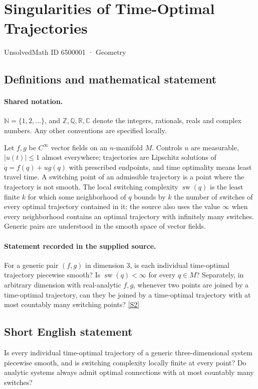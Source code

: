 \documentclass[11pt]{article}
\newcommand{\sref}[2]{\hyperlink{source:#1:#2}{[S#2]}}
\begin{document}
\setcounter{section}{6500000}
\section{Singularities of Time-Optimal Trajectories}\label{6500001}
{\small\sffamily UnsolvedMath ID 6500001 · Geometry}
\subsection{Definitions and mathematical statement}

\paragraph{Shared notation.}$\mathbb N=\{1,2,\ldots\}$, and $\mathbb Z,\mathbb Q,\mathbb R,\mathbb C$ denote the integers, rationals, reals and complex numbers. Any other conventions are specified locally.


Let $f,g$ be $C^\infty$ vector fields on an $n$-manifold $M$. Controls $u$ are measurable, $|u(t)|\leq1$ almost everywhere; trajectories are Lipschitz solutions of $\dot q=f(q)+ug(q)$ with prescribed endpoints, and time optimality means least travel time. A switching point of an admissible trajectory is a point where the trajectory is not smooth. The local switching complexity $\operatorname{sw}(q)$ is the least finite $k$ for which some neighborhood of $q$ bounds by $k$ the number of switches of every optimal trajectory contained in it; the source also uses the value $\infty$ when every neighborhood contains an optimal trajectory with infinitely many switches. Generic pairs are understood in the smooth space of vector fields.
\paragraph{Statement recorded in the supplied source.}
For a generic pair $(f,g)$ in dimension $3$, is each individual time-optimal trajectory piecewise smooth? Is $\operatorname{sw}(q)<\infty$ for every $q\in M$? Separately, in arbitrary dimension with real-analytic $f,g$, whenever two points are joined by a time-optimal trajectory, can they be joined by a time-optimal trajectory with at most countably many switching points? \sref{6500001}{2}
\subsection{Short English statement}
Is every individual time-optimal trajectory of a generic three-dimensional system piecewise smooth, and is switching complexity locally finite at every point? Do analytic systems always admit optimal connections with at most countably many switches?
\end{document}
